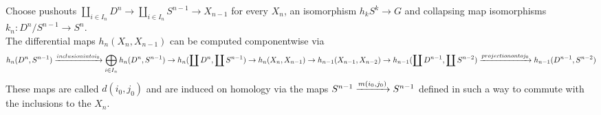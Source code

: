\documentclass[../main.tex]{subfiles}
\begin{document}
Choose pushouts $\coprod_{i\in I_n} D^n \rightarrow \coprod_{i \in I_n} S^{n-1}\to X_{n-1} $ for every $X_n$, an isomorphism $h_k S^{k}\to G$ and collapsing map isomorphisms $k_n: D^{n}/S^{n-1}\to S^{n}$.\\
The differential maps $h_n( X_n,X_{n-1} ) $ can be computed componentwise via 
\[ 
	h_n( D^{n},S^{n-1}) \xrightarrow{inclusion into i_0} \bigoplus_{i \in I_n} h_n( D^{n},S^{n-1}) \to h_n( \coprod D^{n},\coprod S^{n-1}) \to h_n( X_n,X_{n-1} ) \to h_{n-1} ( X_{n-1} ,X_{n-2} ) \to h_{n-1} ( \coprod D^{n-1},\coprod S^{n-2}) \xrightarrow{projection onto j_0	 } h_{n-1} ( D^{n-1}, S^{n-2}) 
\]
These maps are called $d( i_0,j_0) $ and are induced on homology via the maps $S^{n-1}\xrightarrow{m( i_0,j_0) }S^{n-1}$ defined in such a way to commute with the inclusions to the $X_n$.
\end{document}

